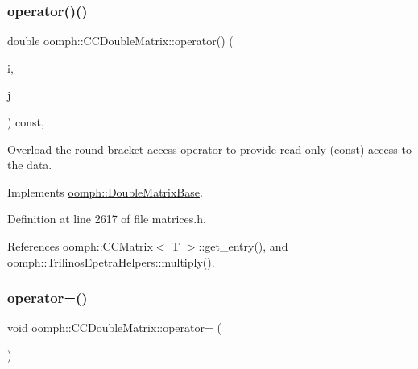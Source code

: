 \mbox{\label{classoomph_1_1CCDoubleMatrix_a2fd1f3dfa66ed45be1ced60d2835634c}} 
\subsubsection{\texorpdfstring{operator()()}{operator()()}}
{\footnotesize\ttfamily double oomph\+::\+C\+C\+Double\+Matrix\+::operator() (\begin{DoxyParamCaption}\item[{const unsigned long \&}]{i,  }\item[{const unsigned long \&}]{j }\end{DoxyParamCaption}) const\hspace{0.3cm}{\ttfamily [inline]}, {\ttfamily [virtual]}}



Overload the round-\/bracket access operator to provide read-\/only (const) access to the data. 



Implements \hyperlink{classoomph_1_1DoubleMatrixBase_a20b85f0286f80464f42f0846fede2d77}{oomph\+::\+Double\+Matrix\+Base}.



Definition at line 2617 of file matrices.\+h.



References oomph\+::\+C\+C\+Matrix$<$ T $>$\+::get\+\_\+entry(), and oomph\+::\+Trilinos\+Epetra\+Helpers\+::multiply().

\mbox{\label{classoomph_1_1CCDoubleMatrix_ad21e909c73b8336792afd20de783e7c7}} 
\subsubsection{\texorpdfstring{operator=()}{operator=()}}
{\footnotesize\ttfamily void oomph\+::\+C\+C\+Double\+Matrix\+::operator= (\begin{DoxyParamCaption}\item[{const \hyperlink{classoomph_1_1CCDoubleMatrix}{C\+C\+Double\+Matrix} \&}]{ }\end{DoxyParamCaption})\hspace{0.3cm}{\ttfamily [inline]}}



